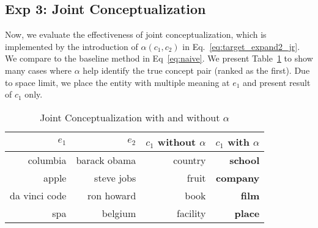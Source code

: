\subsection{Exp 3: Joint Conceptualization}
Now, we evaluate the effectiveness of joint conceptualization, which is implemented by the introduction of $\alpha(c_1,c_2)$ in Eq.~\ref{eq:target_expand2_jr}. 
We compare to the baseline method in Eq~\ref{eq:naive}.
We present Table~\ref{tab:expjc} to show many cases where $\alpha$ help identify the true concept pair (ranked as the first).
Due to space limit, we place the entity with multiple meaning at $e_1$ and present result of $c_1$ only.
\begin{table}[htbp]
  \centering
  \caption{Joint Conceptualization with and without $\alpha$}
    \begin{tabular}{rrrr}
    \toprule
    $e_1$                               & $e_2$                               & $c_1 $  without $\alpha$       & $c_1$  with $\alpha$ \\
    \midrule
    columbia                            & barack obama                        & country                    & \textbf{school }\\
    apple                               & steve jobs                          & fruit                & \textbf{company} \\
   da vinci code           & ron howard                       & book                     & \textbf{film} \\
    spa                                 & belgium                             & facility                  & \textbf{place} \\
    \bottomrule
    \end{tabular}%
  \label{tab:expjc}%
\end{table}%



